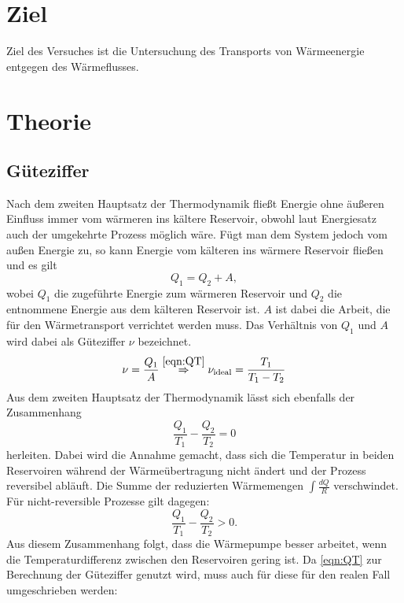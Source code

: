 
\section{Ziel}
Ziel des Versuches ist die Untersuchung des Transports von Wärmeenergie entgegen des Wärmeflusses.

\section{Theorie}

\subsection{Güteziffer}
Nach dem zweiten Hauptsatz der Thermodynamik fließt Energie ohne äußeren Einfluss immer vom wärmeren ins kältere
Reservoir, obwohl laut Energiesatz auch der umgekehrte Prozess möglich wäre.
Fügt man dem System jedoch vom außen Energie zu, so kann Energie vom kälteren ins wärmere Reservoir fließen und es gilt
\begin{equation}
  Q_1=Q_2+A ,
\end{equation}
wobei $Q_1$ die zugeführte Energie zum wärmeren Reservoir und $Q_2$ die entnommene Energie aus dem kälteren Reservoir ist.
$A$ ist dabei die Arbeit, die für den Wärmetransport verrichtet werden muss.
Das Verhältnis von $Q_1$ und $A$ wird dabei als Güteziffer $\nu$ bezeichnet.
\begin{equation}
  \nu=\frac{Q_1}{A} \stackrel{\eqref{eqn:QT}}{\Rightarrow} \nu_\text{ideal} = \frac{T_1}{T_1-T_2} \label{eqn:igüte}
\end{equation}
Aus dem zweiten Hauptsatz der Thermodynamik lässt sich ebenfalls der Zusammenhang
\begin{equation}
  \frac{Q_1}{T_1}-\frac{Q_2}{T_2}=0 \label{eqn:QT}
\end{equation}
herleiten.
Dabei wird die Annahme gemacht, dass sich die Temperatur in beiden Reservoiren während der Wärmeübertragung nicht ändert
und der Prozess reversibel abläuft. Die Summe der reduzierten Wärmemengen $\int{\frac{dQ}{R}}$ verschwindet.
Für nicht-reversible Prozesse gilt dagegen:
\begin{equation}
  \frac{Q_1}{T_1}-\frac{Q_2}{T_2} > 0 .
\end{equation}
Aus diesem Zusammenhang folgt, dass die Wärmepumpe besser arbeitet,
wenn die Temperaturdifferenz zwischen den Reservoiren gering ist.
Da \eqref{eqn:QT} zur Berechnung der Güteziffer \nu genutzt wird, muss auch für diese für den realen Fall
umgeschrieben werden:
